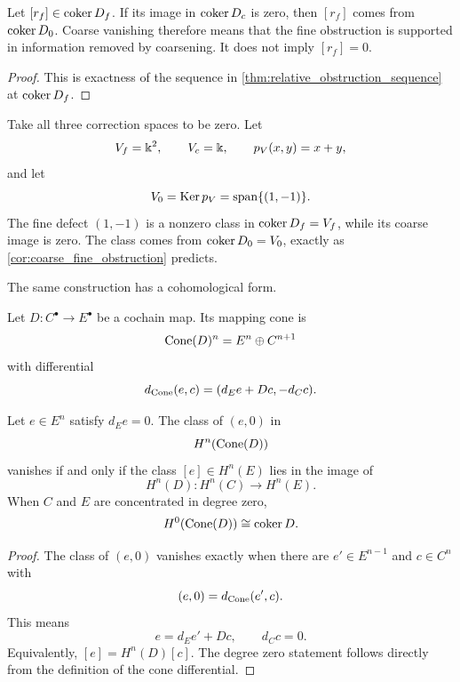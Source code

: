 \begin{corollary}\label{cor:coarse_fine_obstruction}
Let $[r_f]\in\operatorname{coker} D_f$.  If its image in $\operatorname{coker} D_c$ is zero, then $[r_f]$ comes from $\operatorname{coker} D_0$.  Coarse vanishing therefore means that the fine obstruction is supported in information removed by coarsening.  It does not imply $[r_f]=0$.
\end{corollary}

\begin{proof}
This is exactness of the sequence in \cref{thm:relative_obstruction_sequence} at $\operatorname{coker} D_f$.
\end{proof}

\begin{example}\label{ex:coarse_cancellation}
Take all three correction spaces to be zero.  Let
\[
V_f=\Bbbk^2,
\qquad
V_c=\Bbbk,
\qquad
p_V(x,y)=x+y,
\]
and let
\[
V_0=\operatorname{Ker} p_V=\operatorname{span}\{(1,-1)\}.
\]
The fine defect $(1,-1)$ is a nonzero class in $\operatorname{coker} D_f=V_f$, while its coarse image is zero.  The class comes from $\operatorname{coker} D_0=V_0$, exactly as \cref{cor:coarse_fine_obstruction} predicts.
\end{example}

The same construction has a cohomological form.

\begin{definition}\label{def:mapping_cone}
Let $D:C^\bullet\to E^\bullet$ be a cochain map.  Its mapping cone is
\[
\operatorname{Cone}(D)^n=E^n\oplus C^{n+1}
\]
with differential
\[
d_{\operatorname{Cone}}(e,c)=(d_Ee+Dc,-d_Cc).
\]
\end{definition}

\begin{theorem}\label{thm:cone_obstruction}
Let $e\in E^n$ satisfy $d_Ee=0$.  The class of $(e,0)$ in
\[
H^n(\operatorname{Cone}(D))
\]
vanishes if and only if the class $[e]\in H^n(E)$ lies in the image of
\[
H^n(D):H^n(C)\longrightarrow H^n(E).
\]
When $C$ and $E$ are concentrated in degree zero,
\[
H^0(\operatorname{Cone}(D))\cong\operatorname{coker} D.
\]
\end{theorem}

\begin{proof}
The class of $(e,0)$ vanishes exactly when there are $e'\in E^{n-1}$ and $c\in C^n$ with
\[
(e,0)=d_{\operatorname{Cone}}(e',c).
\]
This means
\[
e=d_Ee'+Dc,
\qquad
d_Cc=0.
\]
Equivalently, $[e]=H^n(D)[c]$.  The degree zero statement follows directly from the definition of the cone differential.
\end{proof}

